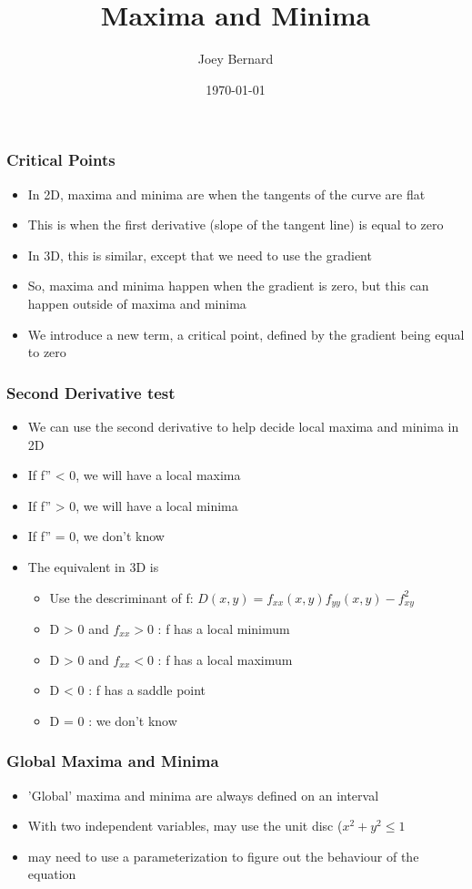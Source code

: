 \documentclass{beamer}
\title{Maxima and Minima}
\author{Joey Bernard}
\institute{University of New Brunswick}
\date{\today}
\begin{document}
\begin{frame}
  \titlepage
\end{frame}

\begin{frame}
  \frametitle{Critical Points}
  \begin{itemize}
  \item In 2D, maxima and minima are when the tangents of the curve are flat
  \item This is when the first derivative (slope of the tangent line) is equal to zero
  \item In 3D, this is similar, except that we need to use the gradient
  \item So, maxima and minima happen when the gradient is zero, but this can happen outside of maxima and minima
  \item We introduce a new term, a critical point, defined by the gradient being equal to zero
  \end{itemize}
\end{frame}

\begin{frame}
  \frametitle{Second Derivative test}
  \begin{itemize}
  \item We can use the second derivative to help decide local maxima and minima in 2D
  \item If f'' < 0, we will have a local maxima
  \item If f'' > 0, we will have a local minima
  \item If f'' = 0, we don't know
  \item The equivalent in 3D is
    \begin{itemize}
    \item Use the descriminant of f: $D(x,y) = f_{xx}(x,y)f_{yy}(x,y) - f_{xy}^2$
    \item D > 0 and $f_{xx} > 0$ : f has a local minimum
    \item D > 0 and $f_{xx} < 0$ : f has a local maximum
    \item D < 0 : f has a saddle point
    \item D = 0 : we don't know
    \end{itemize}
  \end{itemize}
\end{frame}

\begin{frame}
  \frametitle{Global Maxima and Minima}
  \begin{itemize}
  \item 'Global' maxima and minima are always defined on an interval
  \item With two independent variables, may use the unit disc ($x^2 + y^2 \le 1$
  \item may need to use a parameterization to figure out the behaviour of the equation
  \end{itemize}
\end{frame}
\end{document}
